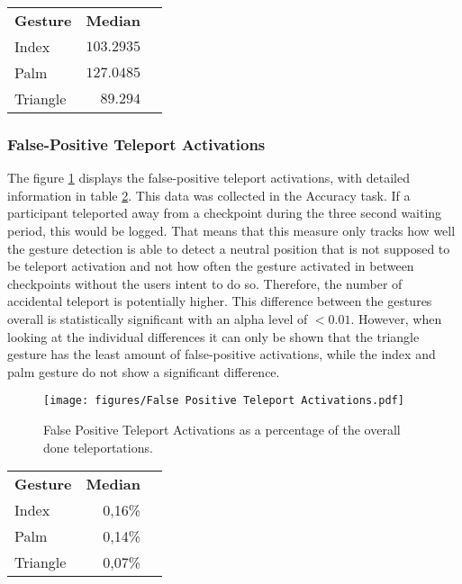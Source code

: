 \begin{table}[]
\centering
\begin{tabular}{lrl}
    \textbf{Gesture} & \textbf{Median} \\
    Index            & $103.2935$               \\
    Palm             & $127.0485$               \\
    Triangle         & $89.294$                
    \label{tbl:taskCompletionTime}
\end{tabular}
\end{table}


\subsubsection{False-Positive Teleport Activations}
The figure \ref{fig:fpActivations} displays the false-positive teleport activations, with detailed information in table \ref{tbl:fpActivations}. This data was collected in the Accuracy task. If a participant teleported away from a checkpoint during the three second waiting period, this would be logged. That means that this measure only tracks how well the gesture detection is able to detect a neutral position that is not supposed to be teleport activation and not how often the gesture activated in between checkpoints without the users intent to do so. Therefore, the number of accidental teleport is potentially higher. This difference between the gestures overall is statistically significant with an alpha level of $<0.01$. However, when looking at the individual differences it can only be shown that the triangle gesture has the least amount of false-positive activations, while the index and palm gesture do not show a significant difference.

\begin{figure}[!h]
    \centering
    \texttt{[image: figures/False Positive Teleport Activations.pdf]}
    \caption{False Positive Teleport Activations as a percentage of the overall done teleportations.}
    \label{fig:fpActivations}
\end{figure}

\begin{table}[!h]
\centering
\begin{tabular}{lrl}
    \textbf{Gesture} & \textbf{Median} \\
    Index            & 0,16\%                            \\
    Palm             & 0,14\%                            \\
    Triangle         & 0,07\%                           
    \label{tbl:fpActivations}
\end{tabular}
\end{table}


